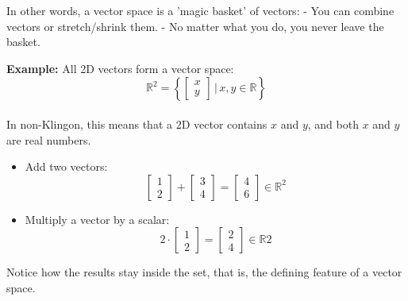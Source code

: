 \documentclass[12pt]{report}
\begin{document}
            In other words, a vector space is a 'magic basket' of vectors: - You can combine vectors or stretch/shrink them.  
                - No matter what you do, you never leave the basket.

            \textbf{Example:} All 2D vectors form a vector space:
            \begin{equation}
                \mathbb{R}^2 = \left\{ \begin{bmatrix}x \\ y\end{bmatrix} \,\bigg|\, x, y \in \mathbb{R} \right\}
            \end{equation} \\

            In non-Klingon, this means that a 2D vector contains $x$ and $y$, and both $x$ and $y$ are real numbers.

            \begin{itemize}
                \item Add two vectors: \\
                \begin{equation}
                    \begin{bmatrix}1 \\ 2 \end{bmatrix} + \begin{bmatrix}3 \\ 4 \end{bmatrix} =         \begin{bmatrix}4 \\ 6 \end{bmatrix} \in \mathbb{R}^2
                \end{equation}
                
                \item Multiply a vector by a scalar: \\
                \begin{equation}
                    2 \cdot \begin{bmatrix}1 \\ 2 \end{bmatrix} =      \begin{bmatrix}2 \\ 4 \end{bmatrix} \in \mathbb{R} 2 \end{equation} \end{itemize}

            Notice how the results stay inside the set, that is, the defining feature of a vector space.
\end{document}
